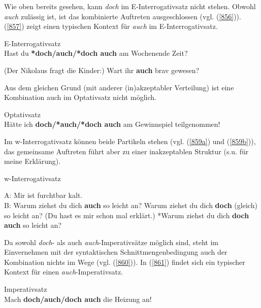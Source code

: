{\noindent
Wie oben bereits gesehen, kann \textit{doch} im E-Interrogativsatz nicht stehen. Obwohl \textit{auch} zulässig ist, ist das kombinierte Auftreten ausgeschlossen (vgl. (\ref{856})). (\ref{857}) zeigt einen typischen Kontext für \textit{auch} im  E-Interrogativsatz.

\begin{exe}
	\ex\label{856}E-Interrogativsatz\\
	Hast du \textbf{*doch/auch/*doch auch} am Wochenende Zeit?
\end{exe}

\begin{exe}
	\ex\label{857}
	(Der Nikolaus fragt die Kinder:) Wart ihr \textbf{auch} brav gewesen? 
	\newline
	\hbox{}\hfill\hbox {\citet[57]{Dahl1988}}
\end{exe}
Aus dem gleichen Grund (mit anderer (in)akzeptabler Verteilung) ist eine Kombination auch im Optativsatz  nicht möglich.

\begin{exe}
	\ex\label{858}Optativsatz\\
	Hätte ich \textbf{doch/*auch/*doch auch} am Gewinnspiel teilgenommen!
\end{exe}
Im w-Interrogativsatz  können beide Partikeln stehen (vgl. (\ref{859a}) und (\ref{859b})), das gemeinsame Auftreten führt aber zu einer inakzeptablen Struktur (s.u. für meine Erklärung).
	
\begin{exe}
	\ex\label{859}w-Interrogativsatz\\[-1.25em]
		\begin{xlist}	
			\ex\label{859a} A: Mir ist furchtbar kalt.\\
			B: Warum ziehst du dich \textbf{auch} so leicht an?
			\hfill\hbox {\citet[89]{Helbig1990}}
			\ex\label{859b} Warum ziehst du dich \textbf{doch} (gleich) so leicht an? (Du hast es mir schon mal erklärt.)	
	 		\ex\label{859c} *Warum ziehst du dich \textbf{doch auch} so leicht an?			
		\end{xlist}
\end{exe}		
Da sowohl \textit{doch}- als auch \textit{auch}-Imperativsätze möglich sind, steht im Einverneh\-men mit der syntaktischen Schnittmengenbedingung auch der Kombination nichts im Wege (vgl. (\ref{860})). In (\ref{861}) findet sich ein typischer Kontext für einen \textit{auch}-Imperativsatz.

\begin{exe}
	\ex\label{860}Imperativsatz\\
	Mach \textbf{doch/auch/doch auch} die Heizung an!
\end{exe}

}
